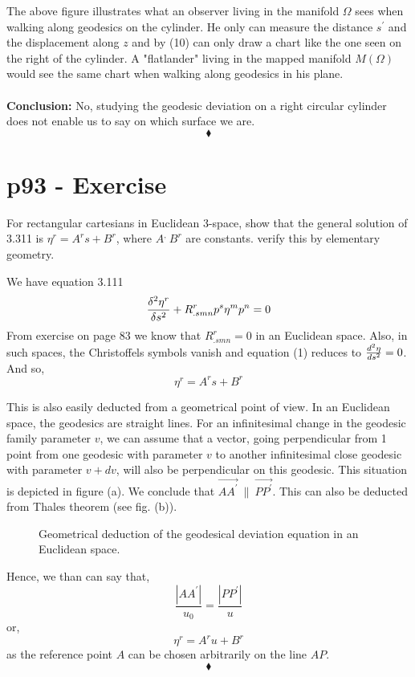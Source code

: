 The above figure illustrates what an observer living in the manifold $\Omega$ sees when walking along geodesics on the cylinder.  He only can measure the distance $s^{'}$ and the displacement along $z$ and by (10) can only draw a chart like the one seen on the right of the cylinder. A "flatlander" living in the mapped manifold $M(\Omega)$ would see the same chart when walking along geodesics in his plane.\\\\
\textbf{Conclusion:} No, studying the geodesic deviation on a right circular cylinder does not enable us to say on which surface we are.
$$\blacklozenge$$
\newpage

\section{p93 - Exercise}
\begin{tcolorbox}
For rectangular cartesians in Euclidean 3-space, show that the general solution of 3.311 is $\eta^r = A^r s+B^r $, where $A^, \ B^r$ are constants. verify this by elementary geometry. 
\end{tcolorbox}
We have equation 3.111
\begin{align}
\fdv[2]{\eta^r}{s}+ R^r_{.smn} p^s \eta^m p^n=0
\end{align}
From exercise on page 83 we know that $R^r_{.smn}=0$ in an Euclidean space. Also, in such spaces, the Christoffels symbols vanish and equation (1) reduces to $ \dv[2]{\eta}{s} = 0$. And so, $$\eta^r = A^r s+B^r $$

This is also easily deducted from a geometrical point of view. In an Euclidean space, the geodesics are straight lines. For an infinitesimal change in the geodesic family parameter $v$, we can assume that a vector, going perpendicular from 1 point from one geodesic with parameter $v$  to another infinitesimal close  geodesic with parameter $v+dv$,  will also be perpendicular on this geodesic. This situation is depicted in figure (a). We conclude that $\overrightarrow{AA^{'}} \ \parallel \ \overrightarrow{PP^{'}}$. This can also be deducted from Thales theorem (see fig. (b)). 
\begin{figure}[H]%
    \centering
    \subfloat[]{}
	\qquad
    \subfloat[]{}
\caption{Geometrical deduction of the geodesical deviation equation in an Euclidean space.}
\end{figure}
Hence, we than can say that,
$$ \frac{\left|AA^{'}\right|}{u_0}=\frac{\left|PP^{'}\right|}{u}  $$
or, $$ \eta^r = A^r u + B^r $$ as the reference point $A$ can be chosen arbitrarily on the line $AP$.
$$\blacklozenge$$
\newpage

